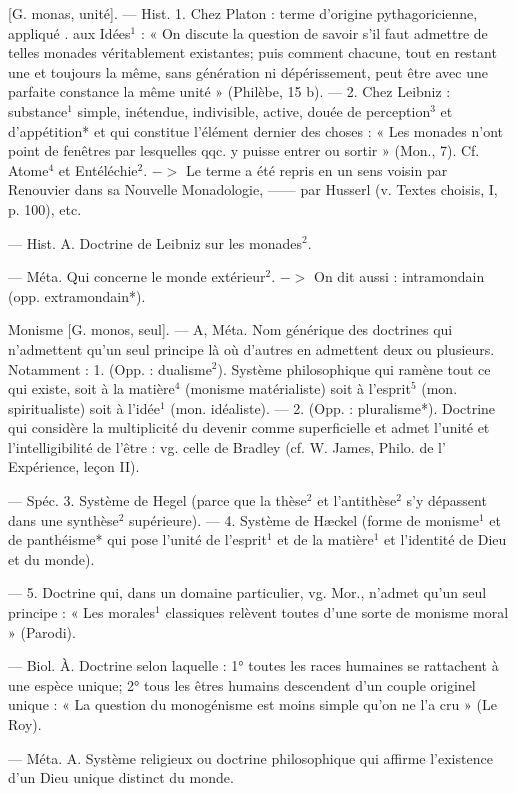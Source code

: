 \begin{itemize}[leftmargin=1cm, label=, itemsep=1pt]
 [G. monas, unité]. — Hist.
1. Chez Platon : terme d’origine
pythagoricienne, appliqué . aux
Idées$^1$ : « On discute la question de
savoir s’il faut admettre de telles
monades véritablement existantes;
puis comment chacune, tout en
restant une et toujours la même,
sans génération ni dépérissement,
peut être avec une parfaite constance la même unité » (Philèbe, 15 b).
— 2. Chez Leibniz : substance$^1$
simple, inétendue, indivisible, active,
douée de perception$^3$ et d’appétition* et qui constitue l'élément dernier des choses : « Les monades n’ont
point de fenêtres par lesquelles qqc.
y puisse entrer ou sortir » (Mon., 7).
Cf. Atome$^4$ et Entéléchie$^2$. $->$ Le
terme a été repris en un sens voisin
par Renouvier dans sa Nouvelle
Monadologie, —— par Husserl (v.
Textes choisis, I, p. 100), etc.

 — Hist. A. Doctrine de
Leibniz sur les monades$^2$.

 — Méta. Qui concerne le
monde extérieur$^2$. $->$ On dit aussi :
intramondain (opp. extramondain*).

Monisme\ib{} [G. monos, seul]. — A, Méta.
Nom générique des doctrines qui
n’admettent qu’un seul principe là
où d’autres en admettent deux ou
plusieurs. Notamment : 1. (Opp. :
dualisme$^2$). Système philosophique
qui ramène tout ce qui existe, soit
à la matière$^4$ (monisme matérialiste) soit à l’esprit$^5$ (mon. spiritualiste) soit à l’idée$^1$ (mon. idéaliste).
— 2. (Opp. : pluralisme*). Doctrine
qui considère la multiplicité du
devenir comme superficielle et admet
l'unité et l’intelligibilité de l’être :
vg. celle de Bradley (cf. W. James,
Philo. de l’ Expérience, leçon II).

— Spéc. 3. Système de Hegel
(parce que la thèse$^2$ et l’antithèse$^2$
s'y dépassent dans une synthèse$^2$
supérieure). — 4. Système de Hæckel
(forme de monisme$^1$ et de panthéisme* qui pose l’unité de l'esprit$^1$
et de la matière$^1$ et l'identité de
Dieu et du monde).

— 5. Doctrine qui, dans un domaine particulier, vg. Mor., n’admet
qu'un seul principe : « Les morales$^1$
classiques relèvent toutes d’une
sorte de monisme moral » (Parodi).

 — Biol. À. Doctrine
selon laquelle : 1° toutes les races
humaines se rattachent à une espèce
unique; 2° tous les êtres humains
descendent d’un couple originel
unique : « La question du monogénisme est moins simple qu’on ne l’a
cru » (Le Roy).

 — Méta. A. Système
religieux ou doctrine philosophique
qui affirme l'existence d’un Dieu
unique distinct du monde.


\end{itemize}
